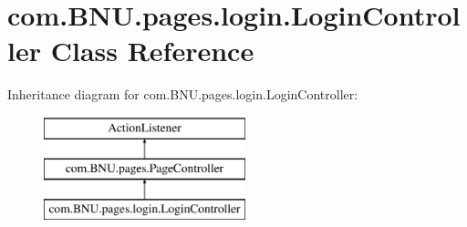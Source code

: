 \hypertarget{classcom_1_1_b_n_u_1_1pages_1_1login_1_1_login_controller}{}\section{com.\+B\+N\+U.\+pages.\+login.\+Login\+Controller Class Reference}
\label{classcom_1_1_b_n_u_1_1pages_1_1login_1_1_login_controller}
Inheritance diagram for com.\+B\+N\+U.\+pages.\+login.\+Login\+Controller\+:\begin{figure}[H]
\begin{center}
\leavevmode
\includegraphics[height=3.000000cm]{classcom_1_1_b_n_u_1_1pages_1_1login_1_1_login_controller}
\end{center}
\end{figure}
